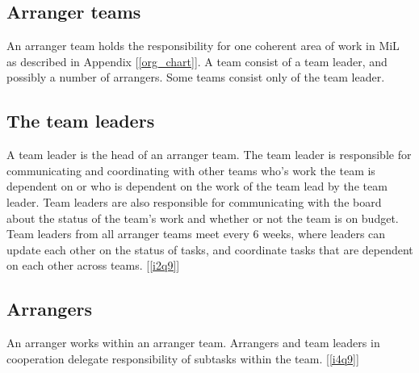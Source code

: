 \subsection{Arranger teams} %
\label{sub:arranger_team}
An arranger team holds the responsibility for one coherent area of work in MiL as described in Appendix [\ref{org_chart}]. A team consist of a team leader, and possibly a number of arrangers. Some teams consist only of the team leader.

\subsection{The team leaders}
\label{sub:team_leaders}
A team leader is the head of an arranger team. The team leader is responsible for communicating and coordinating with other teams who's work the team is dependent on or who is dependent on the work of the team lead by the team leader. Team leaders are also responsible for communicating with the board about the status of the team's work and whether or not the team is on budget. Team leaders from all arranger teams meet every 6 weeks, where leaders can update each other on the status of tasks, and coordinate tasks that are dependent on each other across teams. [\ref{i2q9}]

\subsection{Arrangers}
\label{sub:team_members}
An arranger works within an arranger team. Arrangers and team leaders in cooperation delegate responsibility of subtasks within the team. [\ref{i4q9}]

